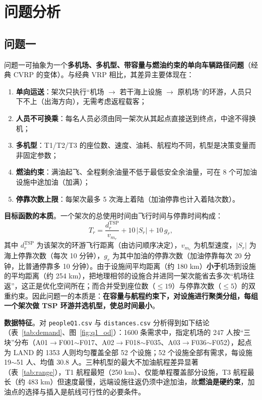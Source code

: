 \documentclass[UTF8,zihao=-4]{ctexart}
\numberwithin{figure}{section}
\numberwithin{table}{section}
\begin{document}
\section{问题分析}

\subsection{问题一}\label{sec:analysis}

问题一可抽象为一个\textbf{多机场、多机型、带容量与燃油约束的单向车辆路径问题}（经典 CVRP 的变体）。与经典 VRP 相比，其差异主要体现在：

\begin{enumerate}
  \item \textbf{单向运送}：架次只执行“机场 $\to$ 若干海上设施 $\to$ 原机场”的环游，人员只下不上（出海方向），无需考虑返程载客；
  \item \textbf{人员不可换乘}：每名人员必须由同一架次从其起点直接送到终点，中途不得换机；
  \item \textbf{多机型}：T1/T2/T3 的座位数、速度、油耗、航程均不同，机型是决策变量而非固定参数；
  \item \textbf{燃油约束}：满油起飞、全程剩余油量不低于最低安全余油量，可在 8 个可加油设施中途加油（加满）；
  \item \textbf{停靠次数上限}：每架次最多 5 次海上着陆（加油停靠也计入着陆次数）。
\end{enumerate}

\textbf{目标函数的本质}。一个架次的总使用时间由飞行时间与停靠时间构成：
\begin{equation}
  T_r = \frac{d_r^{\mathrm{TSP}}}{v_{m_r}} + 10\,|S_r| + 10\,g_r,
\end{equation}
其中 $d_r^{\mathrm{TSP}}$ 为该架次的环游飞行距离（由访问顺序决定），$v_{m_r}$ 为机型速度，$|S_r|$ 为海上停靠次数（每次 10 分钟），$g_r$ 为其中加油的停靠次数（加油停靠每次 20 分钟，比普通停靠多 10 分钟）。由于设施间平均距离（约 180 km）\textbf{小于}机场到设施的平均距离（约 254 km），把地理相邻的设施合并进同一架次能省去多次“机场往返”，这正是优化空间所在；而合并受到座位数（$\le 19$）与停靠次数（$\le 5$）的双重约束。因此问题一的本质是：\textbf{在容量与航程约束下，对设施进行聚类分组，每组一个架次做 TSP 环游并选机型，使总时间最小}。

\textbf{数据特征}。对 \texttt{peopleQ1.csv} 与 \texttt{distances.csv} 分析得到如下结论（表~\ref{tab:demand}、图~\ref{fig:q1_od}）：1600 条需求中，指定机场的 247 人按“三块”分布（A01$\to$F001$\sim$F017、A02$\to$F018$\sim$F035、A03$\to$F036$\sim$F052），起点为 LAND 的 1353 人则均匀覆盖全部 52 个设施；52 个设施全部有需求，每设施 19$\sim$51 人、均值 30.8 人。三种机型的最大不加油航程差异显著（表~\ref{tab:range}），T1 航程最短（250 km）、仅能单程覆盖部分设施，T3 航程最长（约 483 km）但速度最慢，远端设施往返仍须中途加油，故\textbf{燃油是硬约束}，加油点的选择与插入是航线可行性的必要条件。
\end{document}

